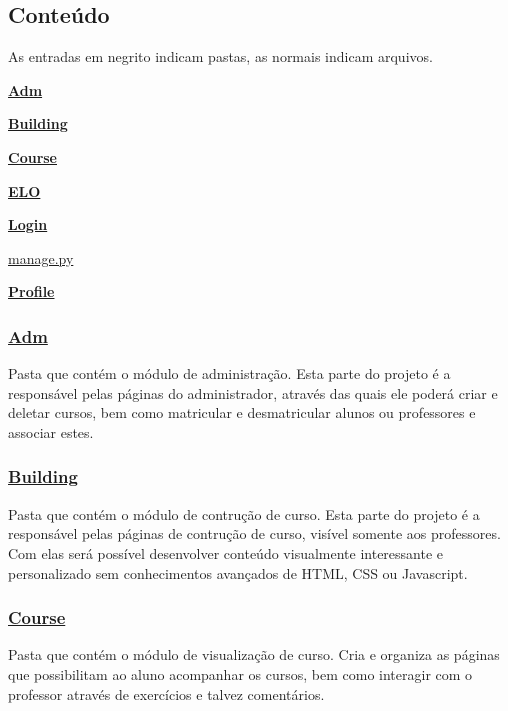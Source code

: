 \subsection*{Conteúdo}

As entradas em negrito indicam pastas, as normais indicam arquivos.


\begin{DoxyItemize}
\item {\bfseries \hyperlink{namespaceAdm}{Adm}}
\item {\bfseries \hyperlink{namespaceBuilding}{Building}}
\item {\bfseries \hyperlink{namespaceCourse}{Course}}
\item {\bfseries \hyperlink{namespaceELO}{E\-L\-O}}
\item {\bfseries \hyperlink{namespaceLogin}{Login}}
\item \hyperlink{manage_8py}{manage.\-py}
\item {\bfseries \hyperlink{namespaceProfile}{Profile}}
\end{DoxyItemize}

\subsubsection*{\hyperlink{namespaceAdm}{Adm}}

Pasta que contém o módulo de administração. Esta parte do projeto é a responsável pelas páginas do administrador, através das quais ele poderá criar e deletar cursos, bem como matricular e desmatricular alunos ou professores e associar estes.

\subsubsection*{\hyperlink{namespaceBuilding}{Building}}

Pasta que contém o módulo de contrução de curso. Esta parte do projeto é a responsável pelas páginas de contrução de curso, visível somente aos professores. Com elas será possível desenvolver conteúdo visualmente interessante e personalizado sem conhecimentos avançados de H\-T\-M\-L, C\-S\-S ou Javascript.

\subsubsection*{\hyperlink{namespaceCourse}{Course}}

Pasta que contém o módulo de visualização de curso. Cria e organiza as páginas que possibilitam ao aluno acompanhar os cursos, bem como interagir com o professor através de exercícios e talvez comentários.

